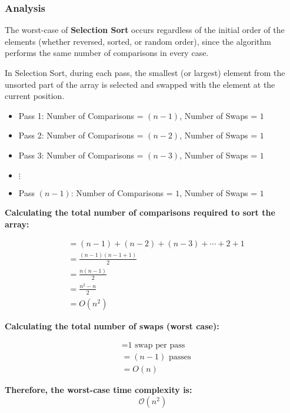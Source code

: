 \subsubsection{Analysis}

The worst-case of \textbf{Selection Sort} occurs regardless of the initial order of the elements (whether reversed, sorted, or random order), since the algorithm performs the same number of comparisons in every case.

In Selection Sort, during each pass, the smallest (or largest) element from the unsorted part of the array is selected and swapped with the element at the current position.

\begin{itemize}
    \item Pass 1: Number of Comparisons = $(n-1)$, Number of Swaps = $1$
    \item Pass 2: Number of Comparisons = $(n-2)$, Number of Swaps = $1$
    \item Pass 3: Number of Comparisons = $(n-3)$, Number of Swaps = $1$
    \item[] $\vdots$
    \item Pass $(n-1)$: Number of Comparisons = $1$, Number of Swaps = $1$
\end{itemize}

\textbf{Calculating the total number of comparisons required to sort the array:}
\begin{center}
    \begin{align*}
        &= (n - 1) + (n - 2) + (n - 3) + \cdots + 2 + 1 \\
        &= \frac{(n - 1)(n - 1 + 1)}{2} \\
        &= \frac{n(n - 1)}{2} \\
        &= \frac{n^2 - n}{2} \\
        &= \textbf{\(O(n^2)\)}
    \end{align*}
\end{center}

\textbf{Calculating the total number of swaps (worst case):}
\begin{center}
    \begin{align*}
        &= \text{1 swap per pass} \\
        &= (n - 1) \text{ passes} \\
        &= \textbf{\(O(n)\)}
    \end{align*}
\end{center}

\bigskip

\noindent
\textbf{Therefore, the worst-case time complexity is:}
\[
\mathcal{O}(n^2)
\]
